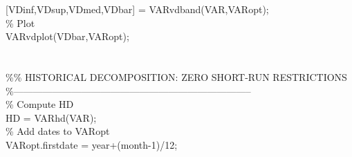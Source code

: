 \hspace{1mm}\hspace{5mm} \hspace{5mm} [VDinf,VDsup,VDmed,VDbar] = VARvdband(VAR,VARopt); \\ 
\hspace{1mm}\hspace{5mm} \hspace{5mm} \textcolor{matlabgreen}{\% Plot }\\ 
\hspace{1mm}\hspace{5mm} \hspace{5mm} VARvdplot(VDbar,VARopt); \\ 
\hspace{1mm}\hspace{5mm} \hspace{5mm}  \\ 
\hspace{1mm}\hspace{5mm} \hspace{5mm}  \\ 
\hspace{1mm}\hspace{5mm} \hspace{5mm} \textcolor{matlabgreen}{\%}\textcolor{matlabgreen}{\% HISTORICAL DECOMPOSITION: ZERO SHORT-RUN RESTRICTIONS }\\ 
\hspace{1mm}\hspace{5mm} \hspace{5mm} \textcolor{matlabgreen}{\%--------------------------------------------------------------------------  }\\ 
\hspace{1mm}\hspace{5mm} \hspace{5mm} \textcolor{matlabgreen}{\% Compute HD }\\ 
\hspace{1mm}\hspace{5mm} \hspace{5mm} HD = VARhd(VAR); \\ 
\hspace{1mm}\hspace{5mm} \hspace{5mm} \textcolor{matlabgreen}{\% Add dates to VARopt  }\\ 
\hspace{1mm}\hspace{5mm} \hspace{5mm} VARopt.firstdate = year+(month-1)/12; \\ 
